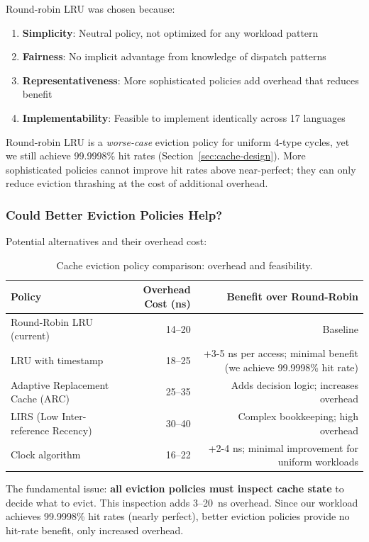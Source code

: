 \documentclass[sigplan,final]{acmart}
\begin{document}
Round-robin LRU was chosen because:

\begin{enumerate}
  \item \textbf{Simplicity}: Neutral policy, not optimized for any workload pattern
  \item \textbf{Fairness}: No implicit advantage from knowledge of dispatch patterns
  \item \textbf{Representativeness}: More sophisticated policies add overhead that reduces benefit
  \item \textbf{Implementability}: Feasible to implement identically across 17 languages
\end{enumerate}

Round-robin LRU is a \emph{worse-case} eviction policy for uniform 4-type cycles, yet we still
achieve 99.9998\% hit rates (Section~\ref{sec:cache-design}). More sophisticated policies cannot
improve hit rates above near-perfect; they can only reduce eviction thrashing at the cost of
additional overhead.

\subsubsection{Could Better Eviction Policies Help?}

Potential alternatives and their overhead cost:

\begin{table}[h]
\centering
\caption{Cache eviction policy comparison: overhead and feasibility.}
\label{tab:eviction-policies}
\begin{tabular}{@{}lrr@{}}
\toprule
\textbf{Policy} & \textbf{Overhead Cost (ns)} & \textbf{Benefit over Round-Robin} \\
\midrule
Round-Robin LRU (current) & 14--20 & Baseline \\
LRU with timestamp & 18--25 & +3-5 ns per access; minimal benefit (we achieve 99.9998\% hit rate) \\
Adaptive Replacement Cache (ARC) & 25--35 & Adds decision logic; increases overhead \\
LIRS (Low Inter-reference Recency) & 30--40 & Complex bookkeeping; high overhead \\
Clock algorithm & 16--22 & +2-4 ns; minimal improvement for uniform workloads \\
\bottomrule
\end{tabular}
\end{table}

The fundamental issue: \textbf{all eviction policies must inspect cache state} to decide what to
evict. This inspection adds 3--20~ns overhead. Since our workload achieves 99.9998\% hit rates
(nearly perfect), better eviction policies provide no hit-rate benefit, only increased overhead.
\end{document}
